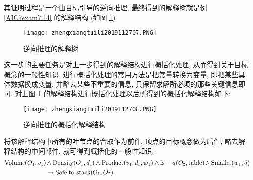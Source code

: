 其证明过程是一个由目标引导的逆向推理, 最终得到的解释树就是例  \ref{AIC7exam7.14} 的解释结构 (如图 \ref{AI32fig2707}).
\begin{figure}[H]
\centering
\texttt{[image: zhengxiangtuili2019112707.PNG]}
\caption{逆向推理的解释树}
\label{AI32fig2707}
\vspace{-0.3cm}
\end{figure}

这一步的主要任务是对上一步得到的解释结构进行概括化处理, 从而得到关于目标概念的一般性知识.
     进行概括化处理的常用方法是把常量转换为变量, 即把某些具体数据换成变量, 并略去某些不重要的信息, 只保留求解所必须的那些关键信息即可.
     对上图 \ref{AI32fig2707} 的解释结构进行概括化处理以后所得到的概括化解释结构如下:
\begin{figure}[H]
    \centering
    \texttt{[image: zhengxiangtuili2019112708.PNG]}
    \caption{逆向推理的概括化解释结构}
    \label{AI32fig2708}
    \vspace{-0.3cm}
\end{figure}
 将该解释结构中所有的叶节点的合取作为前件, 顶点的目标概念做为后件, 略去解释结构的中间部件, 就可得到概括化的一般性知识:
\begin{align}
  \textup{Volume} (O_1,v_1)&\wedge \textup{Density} (O_1,d_1)\wedge \textup{Product} (v_1,d_1,w_1)\wedge \textup{Is}-a (O_2,\textup{table})\wedge\textup{Smaller} (w_1,5)\notag\\
                          &\rightarrow \textup{Safe-to-stack} (O_1,O_2).
\end{align}
